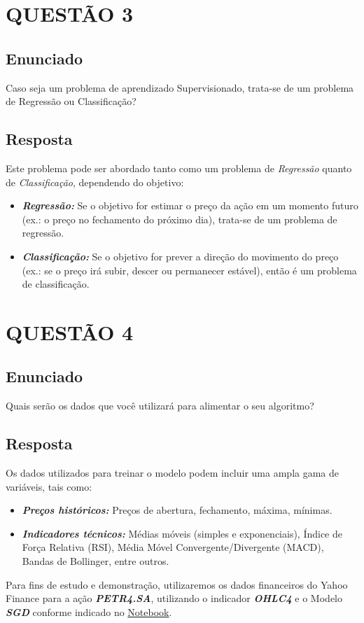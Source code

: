 \documentclass[a4paper, 12pt, onecolumn,singlespacing]{article}
\begin{document}
	\section{QUESTÃO 3}
	
	\subsection{Enunciado}
	Caso seja um problema de aprendizado Supervisionado, trata-se de um problema de Regressão ou Classificação?
	
	\subsection{Resposta}
		Este problema pode ser abordado tanto como um problema de \textit{Regressão} quanto de \textit{Classificação}, dependendo do objetivo:
		\begin{itemize}
			\item 	\textbf{\textit{Regressão:}} Se o objetivo for estimar o preço da ação em um momento futuro (ex.: o preço no fechamento do próximo dia), trata-se de um problema de regressão.
			\item 	\textbf{\textit{Classificação:}} Se o objetivo for prever a direção do movimento do preço (ex.: se o preço irá subir, descer ou permanecer estável), então é um problema de classificação.
		\end{itemize}
		
	\section{QUESTÃO 4}
	
	\subsection{Enunciado}
		Quais serão os dados que você utilizará para alimentar o seu algoritmo?
	
	\subsection{Resposta}
	
		Os dados utilizados para treinar o modelo podem incluir uma ampla gama de variáveis, tais como:
		\begin{itemize}
			\item \textbf{\textit{Preços históricos:}} Preços de abertura, fechamento, máxima, mínimas.
			\item \textbf{\textit{Indicadores técnicos:}} Médias móveis (simples e exponenciais), Índice de Força Relativa (RSI), Média Móvel Convergente/Divergente (MACD), Bandas de Bollinger, entre outros.
			
		\end{itemize}
	
	Para fins de estudo e demonstração, utilizaremos os dados financeiros do Yahoo Finance para a ação \textit{\textbf{PETR4.SA}}, utilizando o indicador \textbf{\textit{OHLC4}} e o Modelo \textit{\textbf{SGD}} conforme indicado no \href{file://Codigo_Problema_02_aula_02.ipynb}{Notebook}.
	
		
\end{document}

